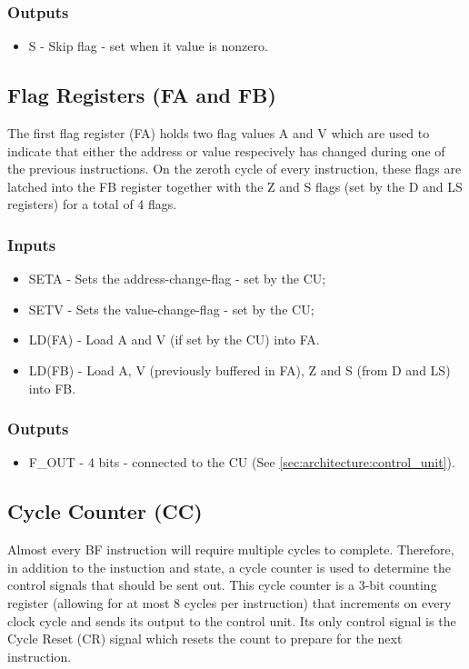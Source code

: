 \subsubsection*{Outputs}
\begin{itemize}
\itemsep0em 
\item S - Skip flag - set when it value is nonzero.
\end{itemize}

\subsection{Flag Registers (FA and FB)} \label{sec:architecture:flags}
The first flag register (FA) holds two flag values A and V which are used to indicate that either the address or value respecively has changed during one of the previous instructions. On the zeroth cycle of every instruction, these flags are latched into the FB register together with the Z and S flags (set by the D and LS registers) for a total of 4 flags.

\subsubsection*{Inputs}
\begin{itemize}
\itemsep0em 
\item SETA - Sets the address-change-flag - set by the CU;
\item SETV - Sets the value-change-flag - set by the CU;
\item LD(FA) - Load A and V (if set by the CU) into FA.
\item LD(FB) - Load A, V (previously buffered in FA), Z and S (from D and LS) into FB. 
\end{itemize}

\subsubsection*{Outputs}
\begin{itemize}
\itemsep0em 
\item F\_OUT - 4 bits - connected to the CU (See \ref{sec:architecture:control_unit}).
\end{itemize}


\subsection{Cycle Counter (CC)} \label{sec:architecture:cc}
Almost every BF instruction will require multiple cycles to complete. Therefore, in addition to the instuction and state, a cycle counter is used to determine the control signals that should be sent out.  This cycle counter is a 3-bit counting register (allowing for at most 8 cycles per instruction) that increments on every clock cycle and sends its output to the control unit. Its only control signal is the Cycle Reset (CR) signal which resets the count to prepare for the next instruction.

